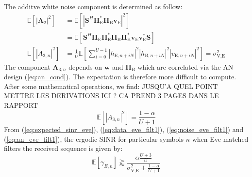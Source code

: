 \documentclass[journal,comsoc]{IEEEtran}
\newcommand{\module}[1]{\left|#1\right|}
\newcommand{\EX}[1]{\mathbb{E} \left[#1\right]}%
\newcommand{\HE}{\textbf{H}_{\text{E}}}
\newcommand{\HB}{\textbf{H}_{\text{B}}}
\newcommand{\ve}{\textbf{v}_{\text{E}}}
\newcommand{\spread}{\textbf{S}}
\begin{document}
The additve white noise component is determined as follow:
\begin{equation}
	\begin{split}
	\EX{|\textbf{A}_{2}|^2} &=  \EX{\module{\spread^H \HE^* \HB \ve}^2} \\
	&=\EX{\spread^H   \HE \HE^* \HB\HB^*  \ve \ve^* \spread } \\
	\EX{|A_{2,n}|^2} &= \frac{1}{U} \EX{\sum_{i=0}^{U-1} |h_{\text{E}, n + iN}|^2 |h_{\text{B}, n + iN}|^2 |v_{\text{E}, n + iN}|^2} = \sigma^2_{\text{V,E}}
	\end{split}
	\label{eq:noise_eve_filt1}
\end{equation}
The component $\textbf{A}_{3,n}$ depends on $\textbf{w}$ and $\HB$ which are correlated via the AN design (\ref{eq:an_cond}). The expectation is therefore more difficult to compute. After some mathematical operations, we find: {\color{red} JUSQU'A QUEL POINT METTRE LES DERIVATIONS ICI ? CA PREND 3 PAGES DANS LE RAPPORT}
\begin{equation}
	\EX{|A_{3,n}|^2} = \frac{1-\alpha}{U+1}
	\label{eq:an_eve_filt1}
\end{equation}
From (\ref{eq:expected_sinr_eve}), (\ref{eq:data_eve_filt1}), (\ref{eq:noise_eve_filt1}) and (\ref{eq:an_eve_filt1}),  the ergodic SINR for particular symbols $n$ when Eve matched filters the received sequence is given by:
\begin{equation}
\EX{\gamma_{E,n}} \gtrapprox \frac{\alpha \frac{U+3}{U}}{\sigma^2_{\text{V,E}} + \frac{1-\alpha}{U+1}}
\label{eq:sinr_eve_filt1}
\end{equation}

\end{document}
